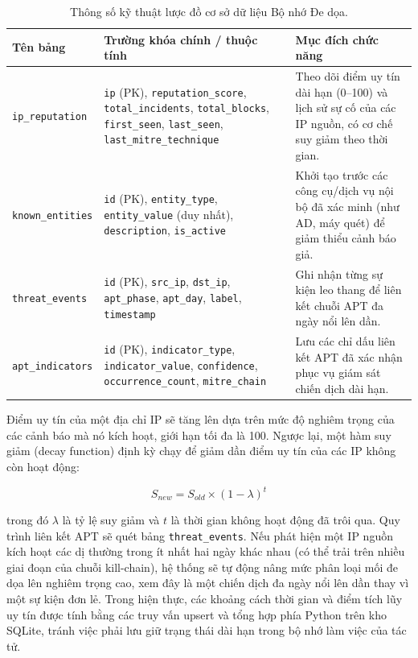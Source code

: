 \begin{table}[H]
    \centering
    \caption{Thông số kỹ thuật lược đồ cơ sở dữ liệu Bộ nhớ Đe dọa.}
    \label{tab:threat_memory_schema}
    \begin{tabular}{|>{\raggedright\arraybackslash}p{}|>{\raggedright\arraybackslash}p{}|>{\raggedright\arraybackslash}p{}|}
        \hline
        \textbf{Tên bảng} & \textbf{Trường khóa chính / thuộc tính} & \textbf{Mục đích chức năng} \\
        \hline
        \texttt{ip\_reputation} & \texttt{ip} (PK), \texttt{reputation\_score}, \texttt{total\_incidents}, \texttt{total\_blocks}, \texttt{first\_seen}, \texttt{last\_seen}, \texttt{last\_mitre\_technique} & Theo dõi điểm uy tín dài hạn (0--100) và lịch sử sự cố của các IP nguồn, có cơ chế suy giảm theo thời gian. \\
        \hline
        \texttt{known\_entities} & \texttt{id} (PK), \texttt{entity\_type}, \texttt{entity\_value} (duy nhất), \texttt{description}, \texttt{is\_active} & Khởi tạo trước các công cụ/dịch vụ nội bộ đã xác minh (như AD, máy quét) để giảm thiểu cảnh báo giả. \\
        \hline
        \texttt{threat\_events} & \texttt{id} (PK), \texttt{src\_ip}, \texttt{dst\_ip}, \texttt{apt\_phase}, \texttt{apt\_day}, \texttt{label}, \texttt{timestamp} & Ghi nhận từng sự kiện leo thang để liên kết chuỗi APT đa ngày nổi lên dần. \\
        \hline
        \texttt{apt\_indicators} & \texttt{id} (PK), \texttt{indicator\_type}, \texttt{indicator\_value}, \texttt{confidence}, \texttt{occurrence\_count}, \texttt{mitre\_chain} & Lưu các chỉ dấu liên kết APT đã xác nhận phục vụ giám sát chiến dịch dài hạn. \\
        \hline
    \end{tabular}
\end{table}

Điểm uy tín của một địa chỉ IP sẽ tăng lên dựa trên mức độ nghiêm trọng của các cảnh báo mà nó kích hoạt, giới hạn tối đa là 100. Ngược lại, một hàm suy giảm (decay function) định kỳ chạy để giảm dần điểm uy tín của các IP không còn hoạt động:

\begin{equation}
    S_{new} = S_{old} \times (1 - \lambda)^{t}
\end{equation}

trong đó $\lambda$ là tỷ lệ suy giảm và $t$ là thời gian không hoạt động đã trôi qua. Quy trình liên kết APT sẽ quét bảng \texttt{threat\_events}. Nếu phát hiện một IP nguồn kích hoạt các dị thường trong ít nhất hai ngày khác nhau (có thể trải trên nhiều giai đoạn của chuỗi kill-chain), hệ thống sẽ tự động nâng mức phân loại mối đe dọa lên nghiêm trọng cao, xem đây là một chiến dịch đa ngày nổi lên dần thay vì một sự kiện đơn lẻ. Trong hiện thực, các khoảng cách thời gian và điểm tích lũy uy tín được tính bằng các truy vấn upsert và tổng hợp phía Python trên kho SQLite, tránh việc phải lưu giữ trạng thái dài hạn trong bộ nhớ làm việc của tác tử.

